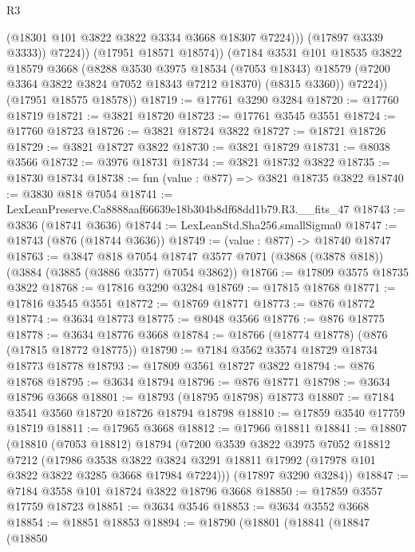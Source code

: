 \begin{lexlean}{R3}
\begin{coremodule}
                    (@18301 @101 @3822 @3822 @3334 @3668 @18307 @7224)))
                (@17897 @3339 @3333))
              @7224))
          (@17951 @18571 @18574))
        (@7184
          @3531
          @101
          @18535
          @3822
          @18579
          @3668
          (@8288
            @3530
            @3975
            @18534
            (@7053 @18343)
            @18579
            (@7200 @3364 @3822 @3824 @7052 @18343 @7212 @18370)
            (@8315 @3360))
          @7224))
      (@17951 @18575 @18578))
@18719 := @17761 @3290 @3284
@18720 := @17760 @18719
@18721 := @3821 @18720
@18723 := @17761 @3545 @3551
@18724 := @17760 @18723
@18726 := @3821 @18724 @3822
@18727 := @18721 @18726
@18729 := @3821 @18727 @3822
@18730 := @3821 @18729
@18731 := @8038 @3566
@18732 := @3976 @18731
@18734 := @3821 @18732 @3822
@18735 := @18730 @18734
@18738 := fun (value : @877) => @3821 @18735 @3822
@18740 := @3830 @818 @7054
@18741 := LexLeanPreserve.Ca8888aaf66639e18b304b8df68dd1b79.R3.__fits_47
@18743 := @3836 (@18741 @3636)
@18744 := LexLeanStd.Sha256.smallSigma0
@18747 := @18743 (@876 (@18744 @3636))
@18749 := (value : @877) -> @18740 @18747
@18763 := @3847
    @818
    @7054
    @18747
    @3577
    @7071
    (@3868 (@3878 @818))
    (@3884 (@3885 (@3886 @3577) @7054 @3862))
@18766 := @17809 @3575 @18735 @3822
@18768 := @17816 @3290 @3284
@18769 := @17815 @18768
@18771 := @17816 @3545 @3551
@18772 := @18769 @18771
@18773 := @876 @18772
@18774 := @3634 @18773
@18775 := @8048 @3566
@18776 := @876 @18775
@18778 := @3634 @18776 @3668
@18784 := @18766 (@18774 @18778) (@876 (@17815 @18772 @18775))
@18790 := @7184 @3562 @3574 @18729 @18734 @18773 @18778
@18793 := @17809 @3561 @18727 @3822
@18794 := @876 @18768
@18795 := @3634 @18794
@18796 := @876 @18771
@18798 := @3634 @18796 @3668
@18801 := @18793 (@18795 @18798) @18773
@18807 := @7184 @3541 @3560 @18720 @18726 @18794 @18798
@18810 := @17859 @3540 @17759 @18719
@18811 := @17965 @3668
@18812 := @17966 @18811
@18841 := @18807
    (@18810
      (@7053 @18812)
      @18794
      (@7200
        @3539
        @3822
        @3975
        @7052
        @18812
        @7212
        (@17986
          @3538
          @3822
          @3824
          @3291
          @18811
          @17992
          (@17978 @101 @3822 @3822 @3285 @3668 @17984 @7224)))
      (@17897 @3290 @3284))
@18847 := @7184 @3558 @101 @18724 @3822 @18796 @3668
@18850 := @17859 @3557 @17759 @18723
@18851 := @3634 @3546
@18853 := @3634 @3552 @3668
@18854 := @18851 @18853
@18894 := @18790
    (@18801
      (@18841
        (@18847
          (@18850

\end{coremodule}
\end{lexlean}
